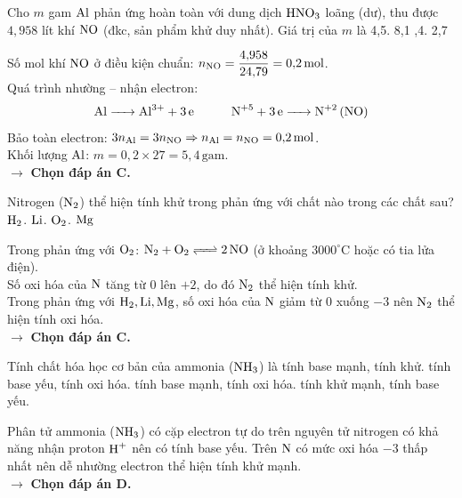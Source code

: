 \documentclass[11pt,a4paper]{article}
\begin{document}
\begin{ex}%
Cho $m$ gam $\ce{Al}$ phản ứng hoàn toàn với dung dịch $\ce{HNO3}$ loãng (dư), thu được $4{,}958$ lít khí $\ce{NO}$ (đkc, sản phẩm khử duy nhất). Giá trị của $m$ là
\choice
{4,5.}
{8,1}
{,4.}
{2,7}
\begin{loigiai}
Số mol khí $\ce{NO}$ ở điều kiện chuẩn: $n_{\ce{NO}} = \dfrac{4{,}958}{24{,}79} = 0{,}2\,\text{mol}$.\\
Quá trình nhường -- nhận electron:
$$\ce{Al -> Al^{3+} + 3e}\quad\quad\quad \ce{N^{+5} + 3e -> N^{+2} (NO)}$$
Bảo toàn electron: $3n_{\ce{Al}} = 3n_{\ce{NO}} \Rightarrow n_{\ce{Al}} = n_{\ce{NO}} = 0{,}2\,\text{mol}$.\\
Khối lượng $\ce{Al}$: $m = 0{,}2 \times 27 = 5{,}4\,\text{gam}$.\\
$\rightarrow$ \textbf{Chọn đáp án C.}
\end{loigiai}
\end{ex}

\begin{ex}%
Nitrogen ($\ce{N2}$) thể hiện tính khử trong phản ứng với chất nào trong các chất sau?
\choice
{$\ce{H2}$.}
{$\ce{Li}$.}
{\True $\ce{O2}$.}
{$\ce{Mg}$}
\begin{loigiai}
Trong phản ứng với $\ce{O2}$: $\ce{N2 + O2 <=> 2NO}$ (ở khoảng $3000^\circ\text{C}$ hoặc có tia lửa điện).\\
Số oxi hóa của $\ce{N}$ tăng từ $0$ lên $+2$, do đó $\ce{N2}$ thể hiện tính khử.\\
Trong phản ứng với $\ce{H2}, \ce{Li}, \ce{Mg}$, số oxi hóa của $\ce{N}$ giảm từ $0$ xuống $-3$ nên $\ce{N2}$ thể hiện tính oxi hóa.\\
$\rightarrow$ \textbf{Chọn đáp án C.}
\end{loigiai}
\end{ex}

\begin{ex}%
Tính chất hóa học cơ bản của ammonia ($\ce{NH3}$) là
\choice
{tính base mạnh, tính khử.}
{tính base yếu, tính oxi hóa.}
{tính base mạnh, tính oxi hóa.}
{\True tính khử mạnh, tính base yếu.}
\begin{loigiai}
Phân tử ammonia ($\ce{NH3}$) có cặp electron tự do trên nguyên tử nitrogen có khả năng nhận proton $\ce{H+}$ nên có tính base yếu. Trên $\ce{N}$ có mức oxi hóa $-3$ thấp nhất nên dễ nhường electron thể hiện tính khử mạnh.\\
$\rightarrow$ \textbf{Chọn đáp án D.}
\end{loigiai}
\end{ex}
\end{document}
